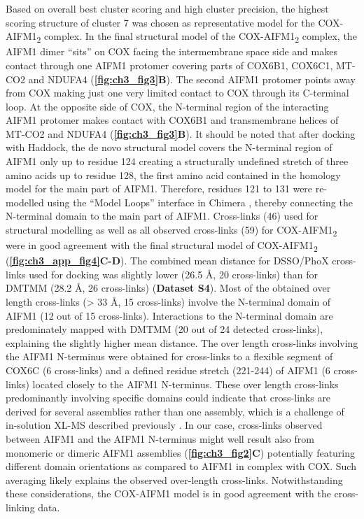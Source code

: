 Based on overall best cluster scoring and high cluster precision, the highest scoring structure of cluster 7 was chosen as representative model for the COX-AIFM1\textsubscript{2} complex. In the final structural model of the COX-AIFM1\textsubscript{2} complex, the AIFM1 dimer “sits” on COX facing the intermembrane space side and makes contact through one AIFM1 protomer covering parts of COX6B1, COX6C1, MT-CO2 and NDUFA4 (\textbf{\autoref{fig:ch3_fig3}B}). The second AIFM1 protomer points away from COX making just one very limited contact to COX through its C-terminal loop. At the opposite side of COX, the N-terminal region of the interacting AIFM1 protomer makes contact with COX6B1 and transmembrane helices of MT-CO2 and NDUFA4 (\textbf{\autoref{fig:ch3_fig3}B}). It should be noted that after docking with Haddock, the de novo structural model covers the N-terminal region of AIFM1 only up to residue 124 creating a structurally undefined stretch of three amino acids up to residue 128, the first amino acid contained in the homology model for the main part of AIFM1. Therefore, residues 121 to 131 were re-modelled using the “Model Loops” interface in Chimera \cite{RN47, RN46}, thereby connecting the N-terminal domain to the main part of AIFM1. Cross-links (46) used for structural modelling as well as all observed cross-links (59) for COX-AIFM1\textsubscript{2} were in good agreement with the final structural model of COX-AIFM1\textsubscript{2} (\textbf{\autoref{fig:ch3_app_fig4}C-D}). The combined mean distance for DSSO/PhoX cross-links used for docking was slightly lower (26.5 Å, 20 cross-links) than for DMTMM (28.2 Å, 26 cross-links) (\textbf{Dataset S4}). Most of the obtained over length cross-links (> 33 Å, 15 cross-links) involve the N-terminal domain of AIFM1 (12 out of 15 cross-links). Interactions to the N-terminal domain are predominately mapped with DMTMM (20 out of 24 detected cross-links), explaining the slightly higher mean distance. The over length cross-links involving the AIFM1 N-terminus were obtained for cross-links to a flexible segment of COX6C (6 cross-links) and a defined residue stretch (221-244) of AIFM1 (6 cross-links) located closely to the AIFM1 N-terminus. These over length cross-links predominantly involving specific domains could indicate that cross-links are derived for several assemblies rather than one assembly, which is a challenge of in-solution XL-MS described previously \cite{RN11}. In our case, cross-links observed between AIFM1 and the AIFM1 N-terminus might well result also from monomeric or dimeric AIFM1 assemblies (\textbf{\autoref{fig:ch3_fig2}C}) potentially featuring different domain orientations as compared to AIFM1 in complex with COX. Such averaging likely explains the observed over-length cross-links. Notwithstanding these considerations, the COX-AIFM1 model is in good agreement with the cross-linking data.

